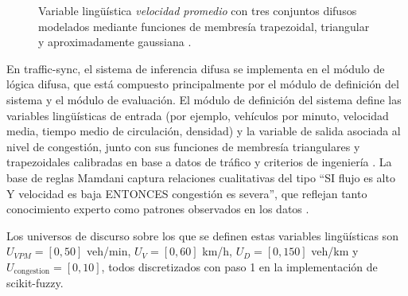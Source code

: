 \begin{figure}[htbp]
\centering
\shorthandoff{>}
\shorthandon{>}
\caption{Variable lingüística \emph{velocidad promedio} con tres conjuntos difusos modelados mediante funciones de membresía trapezoidal, triangular y aproximadamente gaussiana \cite{ross2010fuzzy}.}
\label{fig:fuzzy_velocidad}
\end{figure}

En traffic-sync, el sistema de inferencia difusa se implementa en el módulo de lógica difusa, que está compuesto principalmente por el módulo de definición del sistema y el módulo de evaluación. El módulo de definición del sistema define las variables lingüísticas de entrada (por ejemplo, vehículos por minuto, velocidad media, tiempo medio de circulación, densidad) y la variable de salida asociada al nivel de congestión, junto con sus funciones de membresía triangulares y trapezoidales calibradas en base a datos de tráfico y criterios de ingeniería \cite{ross2010fuzzy,erdinc2023application}. La base de reglas Mamdani captura relaciones cualitativas del tipo ``SI flujo es alto Y velocidad es baja ENTONCES congestión es severa'', que reflejan tanto conocimiento experto como patrones observados en los datos \cite{musriroh2020application}.

Los universos de discurso sobre los que se definen estas variables lingüísticas son $U_{VPM} = [0,50]$ veh/min, $U_V = [0,60]$ km/h, $U_D = [0,150]$ veh/km y $U_{\text{congestion}} = [0,10]$, todos discretizados con paso 1 en la implementación de scikit-fuzzy.

